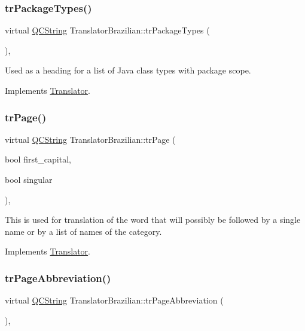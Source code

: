 \subsubsection{\texorpdfstring{trPackageTypes()}{trPackageTypes()}}
{\footnotesize\ttfamily virtual \mbox{\hyperlink{class_q_c_string}{Q\+C\+String}} Translator\+Brazilian\+::tr\+Package\+Types (\begin{DoxyParamCaption}{ }\end{DoxyParamCaption})\hspace{0.3cm}{\ttfamily [inline]}, {\ttfamily [virtual]}}

Used as a heading for a list of Java class types with package scope. 

Implements \mbox{\hyperlink{class_translator}{Translator}}.

\mbox{\label{class_translator_brazilian_a7b2f2fdf05165877ef53da2e660fa4f6}} 
\subsubsection{\texorpdfstring{trPage()}{trPage()}}
{\footnotesize\ttfamily virtual \mbox{\hyperlink{class_q_c_string}{Q\+C\+String}} Translator\+Brazilian\+::tr\+Page (\begin{DoxyParamCaption}\item[{bool}]{first\+\_\+capital,  }\item[{bool}]{singular }\end{DoxyParamCaption})\hspace{0.3cm}{\ttfamily [inline]}, {\ttfamily [virtual]}}

This is used for translation of the word that will possibly be followed by a single name or by a list of names of the category. 

Implements \mbox{\hyperlink{class_translator}{Translator}}.

\mbox{\label{class_translator_brazilian_a885df3aadf542a1b42bae7bb69335ad7}} 
\subsubsection{\texorpdfstring{trPageAbbreviation()}{trPageAbbreviation()}}
{\footnotesize\ttfamily virtual \mbox{\hyperlink{class_q_c_string}{Q\+C\+String}} Translator\+Brazilian\+::tr\+Page\+Abbreviation (\begin{DoxyParamCaption}{ }\end{DoxyParamCaption})\hspace{0.3cm}{\ttfamily [inline]}, {\ttfamily [virtual]}}

